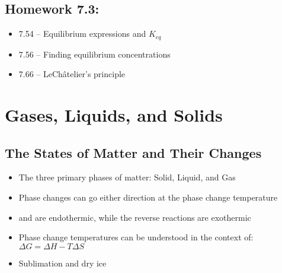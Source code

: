 \documentclass[12pt, openany, letterpaper]{memoir}
\begin{document}
\section*{Homework 7.3:}
\begin{itemize}
  \item 7.54 -- Equilibrium expressions and $K_{eq}$
  \item 7.56 -- Finding equilibrium concentrations
  \item 7.66 -- LeCh\^atelier's principle
\end{itemize}

\chapter{Gases, Liquids, and Solids}
\section{The States of Matter and Their Changes}
\begin{itemize}
	\item The three primary phases of matter: Solid, Liquid, and Gas
	\item Phase changes can go either direction at the phase change temperature
	\item {} and  are endothermic, while the reverse reactions are exothermic
	\item Phase change temperatures can be understood in the context of: $\Delta G = \Delta H - T\Delta S$
	\item Sublimation and dry ice
\end{itemize}
\end{document}
